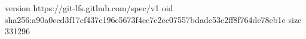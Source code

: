 version https://git-lfs.github.com/spec/v1
oid sha256:a90a0ced3f17cf437e196e5673f4ec7e2ec07557bdadc53c2ff8f764de78eb1c
size 331296
